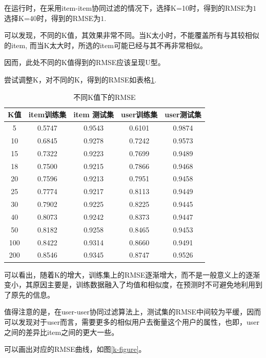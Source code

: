 \documentclass[utf8, a4paper, 11pt, onecolumn]{ctexart}
\begin{document}
\begin{spacing}{1.3}
在运行时，在采用item-item协同过滤的情况下，选择K=10时，得到的RMSE为$1$选择K=40时，得到的RMSE为$1$.

可以发现，不同的K值，其效果非常不同。当K太小时，不能覆盖所有与其较相似的item, 而当K太大时，所选的item可能已经与其不再非常相似。

因而，此处不同的K值得到的RMSE应该呈现U型。

尝试调整K，对不同的K，得到的RMSE如表格\ref{k-table}.

\begin{table}
	\centering
	\begin{tabular}{| c | c | c | c | c |}
		\hline
		\textbf{K值} & item训练集 & item 测试集&user训练集 & user测试集 \\ 
		\hline
		5 & 0.5747 	& 0.9543 & 0.6101 &	0.9874 \\ 
		\hline
		10 & 0.6845 &	0.9278 & 0.7242 &	0.9573 \\
		\hline
		15 & 0.7322 &	0.9223 & 0.7699 &	0.9489 \\
		\hline
		18 & 0.7500 &	0.9215 &	0.7866 &	0.9468 \\
		\hline
		20 & 0.7596 &	0.9213 & 0.7951 &	0.9458 \\
		\hline
		25 & 0.7774 &	0.9217 &	0.8113 &	0.9449 \\ 
		\hline
		30 & 0.7902 &	0.9225 &	0.8225 &	0.9445 \\
		\hline
		40 &0.8073 &	0.9242 &	0.8373 &	0.9447 \\
		\hline
		50 & 0.8182 &	0.9258 &	0.8465 &	0.9453 \\
		\hline
		100 & 0.8422 & 0.9314 &	0.8660 &	0.9491 \\
		\hline
		200 & 0.8546 &	0.9345 &	0.8747 &	0.9526 \\
		\hline 
	\end{tabular}
	\caption{不同K值下的RMSE}
	\label{k-table}
\end{table}

可以看出，随着K的增大，训练集上的RMSE逐渐增大，而不是一般意义上的逐渐变小，其原因主要是，训练数据融入了均值和相似度，在预测时不可避免地利用到了原先的信息。

值得注意的是，在user-user协同过滤算法上，测试集的RMSE中间较为平缓，因而可以发现对于user而言，需要更多的相似用户去衡量这个用户的属性，也即，user之间的差异比item之间的更大一些。

可以画出对应的RMSE曲线，如图\ref{k-figure}。


\end{spacing}
\end{document}
